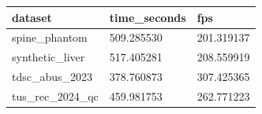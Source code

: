 \begin{tabular}{lll}
dataset & time\_seconds & fps \\
\hline
spine\_phantom & 509.285530 & 201.319137 \\
synthetic\_liver & 517.405281 & 208.559919 \\
tdsc\_abus\_2023 & 378.760873 & 307.425365 \\
tus\_rec\_2024\_qc & 459.981753 & 262.771223 \\
\end{tabular}
